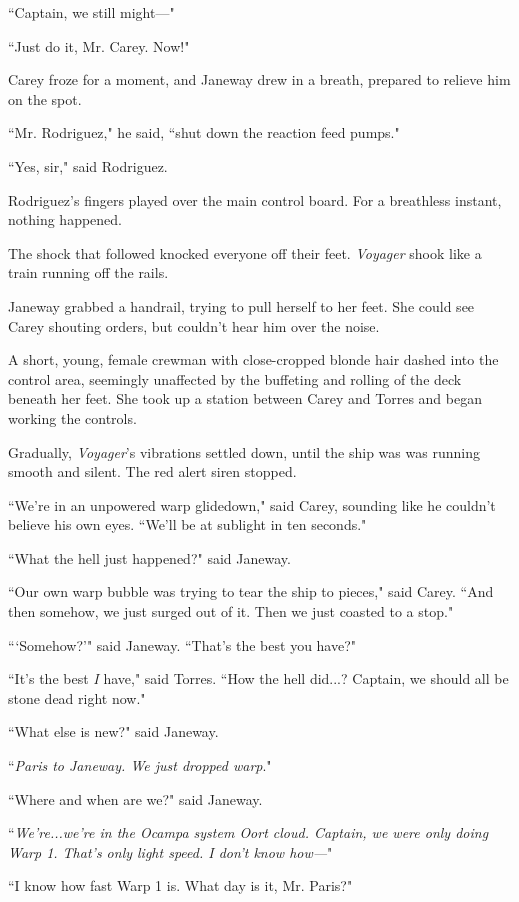 \documentclass[twoside,letterpaper,12pt]{memoir}
\begin{document}
``Captain, we still might---"

``Just do it, Mr. Carey. Now!"

Carey froze for a moment, and Janeway drew in a breath, prepared to relieve him on the spot.

``Mr. Rodriguez," he said, ``shut down the reaction feed pumps."

``Yes, sir," said Rodriguez.

Rodriguez's fingers played over the main control board. For a breathless instant, nothing happened.

The shock that followed knocked everyone off their feet. \textit{Voyager} shook like a train running off the rails.

Janeway grabbed a handrail, trying to pull herself to her feet. She could see Carey shouting orders, but couldn't hear him over the noise.

A short, young, female crewman with close-cropped blonde hair dashed into the control area, seemingly unaffected by the buffeting and rolling of the deck beneath her feet. She took up a station between Carey and Torres and began working the controls.

Gradually, \textit{Voyager}'s vibrations settled down, until the ship was was running smooth and silent. The red alert siren stopped.

``We're in an unpowered warp glidedown," said Carey, sounding like he couldn't believe his own eyes. ``We'll be at sublight in ten seconds."

``What the hell just happened?" said Janeway.

``Our own warp bubble was trying to tear the ship to pieces," said Carey. ``And then somehow, we just surged out of it. Then we just coasted to a stop."

```Somehow?'" said Janeway. ``That's the best you have?"

``It's the best \textit{I} have," said Torres. ``How the hell did...? Captain, we should all be stone dead right now."

``What else is new?" said Janeway.

``\textit{Paris to Janeway. We just dropped warp}."

``Where and when are we?" said Janeway.

``\textit{We're...we're in the Ocampa system Oort cloud. Captain, we were only doing Warp 1. That's only light speed. I don't know how---}"

``I know how fast Warp 1 is. What day is it, Mr. Paris?"
\end{document}
